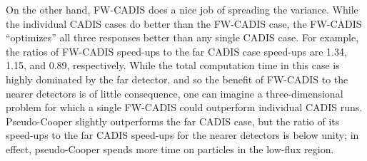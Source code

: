 On the other hand, FW-CADIS does a nice job of spreading the variance.  While
the individual CADIS cases do better than the FW-CADIS case, the FW-CADIS
``optimizes'' all three responses better than any single CADIS case.  For
example, the ratios of FW-CADIS speed-ups to the far CADIS case speed-ups are
1.34, 1.15, and 0.89, respectively.  While the total computation time in this
case is highly dominated by the far detector, and so the benefit of FW-CADIS to
the nearer detectors is of little consequence, one can imagine a
three-dimensional problem for which a single FW-CADIS could outperform
individual CADIS runs.  Pseudo-Cooper slightly outperforms the far CADIS case,
but the ratio of its speed-ups to the far CADIS speed-ups for the nearer
detectors is below unity; in effect, pseudo-Cooper spends more time on particles
in the low-flux region.


